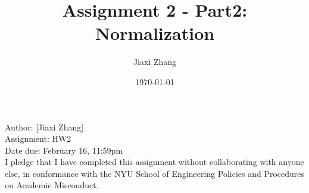 \documentclass{article}
\title{Assignment 2 - Part2: Normalization}
\author{Jiaxi Zhang}
\date{\today}
\begin{document}
\maketitle
\begin{CJK*}{UTF8}{gbsn}
    \begin{flushleft}
    Author: [Jiaxi Zhang]
    \\Assignment: HW2
    \\Date due: February 16, 11:59pm
    \\I pledge that I have completed this assignment without collaborating with anyone else, in conformance with the NYU School of Engineering Policies and Procedures on Academic Misconduct.
    \end{flushleft}



\end{CJK*}
\end{document}
